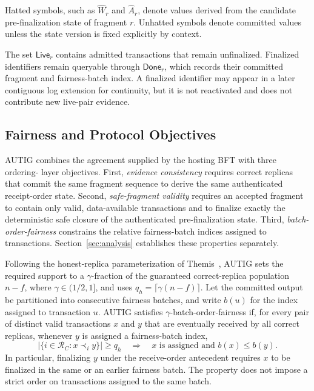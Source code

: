 Hatted symbols, such as $\widehat W_r$ and $\widehat A_r$, denote values
derived from the candidate pre-finalization state of fragment $r$.  Unhatted
symbols denote committed values unless the state version is fixed explicitly
by context.

The set $\mathsf{Live}_r$ contains admitted transactions that remain
unfinalized.  Finalized identifiers remain queryable through
$\mathsf{Done}_r$, which records their committed fragment and fairness-batch
index.  A finalized identifier may appear in a later contiguous log extension
for continuity, but it is not reactivated and does not contribute new
live-pair evidence.

\subsection{Fairness and Protocol Objectives}
\label{sec:fairness-objective}

AUTIG combines the agreement supplied by the hosting BFT with three ordering-
layer objectives.  First, \emph{evidence consistency} requires correct replicas
that commit the same fragment sequence to derive the same authenticated
receipt-order state.  Second, \emph{safe-fragment validity} requires an
accepted fragment to contain only valid, data-available transactions and to
finalize exactly the deterministic safe closure of the authenticated
pre-finalization state.  Third, \emph{batch-order-fairness} constrains the
relative fairness-batch indices assigned to transactions.  Section~\ref{sec:analysis}
establishes these properties separately.

Following the honest-replica parameterization of
Themis~\cite{kelkar2023themis}, AUTIG sets the required support to a
$\gamma$-fraction of the guaranteed correct-replica population $n-f$, where
$\gamma\in(1/2,1]$, and uses $q_h=\lceil\gamma(n-f)\rceil$.
Let the committed output be partitioned into consecutive fairness batches, and
write $b(u)$ for the index assigned to transaction $u$.  AUTIG satisfies
$\gamma$-batch-order-fairness if, for every pair of distinct valid transactions
$x$ and $y$ that are eventually received by all correct replicas, whenever
$y$ is assigned a fairness-batch index,
\begin{equation}
 \left|\{i\in\mathcal R_C:x\prec_i y\}\right|\ge q_h
 \quad\Longrightarrow\quad
 x\text{ is assigned and }b(x)\le b(y).
 \label{eq:batch-order-fairness}
\end{equation}
In particular, finalizing $y$ under the receive-order antecedent requires $x$
to be finalized in the same or an earlier fairness batch.  The property does
not impose a strict order on transactions assigned to the same batch.

